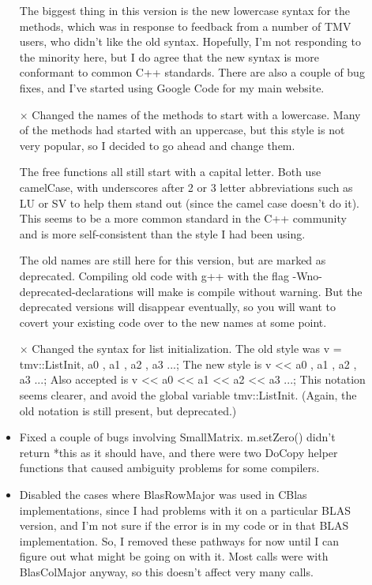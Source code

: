 \documentclass[twoside,letterpaper,11pt]{article}
\begin{document}
\begin{description}
\begin{itemize}
The biggest thing in this version is the new lowercase syntax for the
methods, which was in response to feedback from a number of TMV users, 
who didn't like the old syntax.  Hopefully, I'm not responding to the 
minority here, but I do agree that the new syntax is more conformant 
to common C++ standards.  There are also a couple of bug fixes, and I've
started using Google Code for my main website.

\item[$\times$]
Changed the names of the methods to start with a lowercase.
Many of the methods had started with an uppercase, but this style
is not very popular, so I decided to go ahead and change them.

The free functions all still start with a capital letter.
Both use camelCase, with underscores after 2 or 3 letter abbreviations
such as LU or SV to help them stand out (since the camel case doesn't do it).
This seems to be a more common standard in the C++ community and is more
self-consistent than the style I had been using.

The old names are still here for this version, but are marked as deprecated.
Compiling old code with g++ with the flag -Wno-deprecated-declarations
will make is compile without warning.
But the deprecated versions will disappear eventually, so you will want to
covert your existing code over to the new names at some point.

\item[$\times$]
Changed the syntax for list initialization.
The old style was v = tmv::ListInit, a0 , a1 , a2 , a3  ...;
The new style is v << a0 , a1 , a2 , a3 ...;
Also accepted is v << a0 << a1 << a2 << a3 ...;
This notation seems clearer, and avoid the global variable tmv::ListInit.
(Again, the old notation is still present, but deprecated.)

\item
Fixed a couple of bugs involving SmallMatrix.  
m.setZero() didn't return *this as it should have,
and there were two DoCopy helper functions that caused 
ambiguity problems for some compilers.

\item
Disabled the cases where BlasRowMajor was used in CBlas implementations, 
since I had problems
with it on a particular BLAS version, and I'm not sure if the error
is in my code or in that BLAS implementation.
So, I removed these pathways for now until I can figure out what might
be going on with it.  Most calls were with BlasColMajor anyway, so this
doesn't affect very many calls.


\end{itemize}
\end{description}
\end{document}
